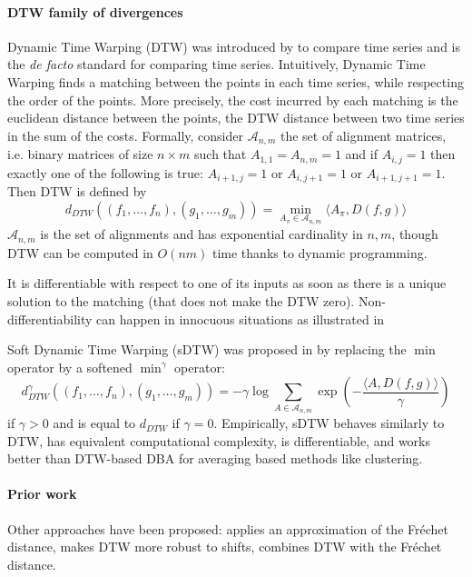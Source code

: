 \paragraph{DTW family of divergences} Dynamic Time Warping (DTW) was introduced by \cite{missing} to compare time series and is the \emph{de facto} standard for comparing time series. Intuitively, Dynamic Time Warping finds a matching between the points in each time series, while respecting the order of the points. More precisely, the cost incurred by each matching is the euclidean distance between the points, the DTW distance between two time series in the sum of the costs. Formally, consider $\mathcal A_{n, m}$ the set of alignment matrices, i.e. binary matrices of size $n\times m$ such that $A_{1,1}=A_{n, m}=1$ and if $A_{i,j} = 1$ then exactly one of the following is true: $A_{i+1, j}=1$ or $A_{i, j+1}=1$ or $A_{i+1, j+1}=1$. Then DTW is defined by
\begin{equation}
    d_{DTW}((f_1, \ldots, f_n), (g_1, \ldots, g_m)) = \min_{A_\pi \in\mathcal A_{n, m}} \langle A_\pi, D(f, g)\rangle
\end{equation}
$\mathcal A_{n,m}$ is the set of alignments and has exponential cardinality in $n, m$, though DTW can be computed in $O(nm)$ time thanks to dynamic programming.

It is differentiable with respect to one of its inputs as soon as there is a unique solution to the matching (that does not make the DTW zero). Non-differentiability can happen in innocuous situations as illustrated in \cite{tavenar-dtw-diff}

Soft Dynamic Time Warping (sDTW) was proposed in \cite{sdtw} by replacing the $\min$ operator by a softened $\min^\gamma$ operator:
\begin{equation}
d_{DTW}^\gamma((f_1, \ldots, f_n), (g_1, \ldots, g_m)) = -\gamma \log \sum_{A \in \mathcal A_{n,m}}\exp\left(-\frac{\langle A, D(f, g)\rangle}{\gamma}\right)
\end{equation}
if $\gamma > 0$ and is equal to $d_{DTW}$ if $\gamma=0$.
Empirically, sDTW behaves similarly to DTW, has equivalent computational complexity, is differentiable, and works better than DTW-based DBA for averaging based methods like clustering.

\paragraph{Prior work}
Other approaches have been proposed: \cite{ref} applies an approximation of the Fréchet distance, \cite{ref} makes DTW more robust to shifts, \cite{ref} combines DTW with the Fréchet distance.

